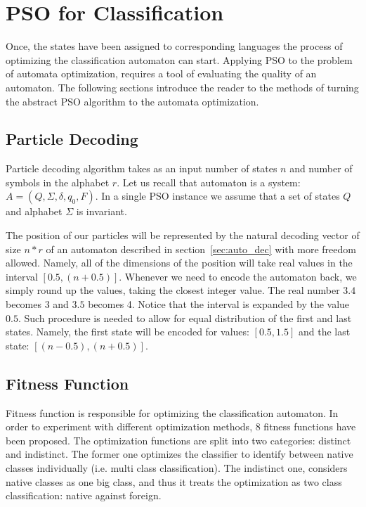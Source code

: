 \documentclass{mini}
\begin{document}
\section{PSO for Classification}

Once, the states have been assigned to corresponding languages the process of optimizing the classification automaton can start. Applying PSO to the problem of automata optimization, requires a tool of evaluating the quality of an automaton. The following sections introduce the reader to the methods of turning the abstract PSO algorithm to the  automata optimization.

\subsection{Particle Decoding}


Particle decoding algorithm takes as an input number of states $n$ and number of symbols in the alphabet $r$.
Let us recall that automaton is a system: $A = (Q, \Sigma, \delta, q_0, F)$. In a single PSO instance we assume that a set of states $Q$ and alphabet $\Sigma$ is invariant. 

The position of our particles will be represented by the natural decoding vector of size $n*r$ of an automaton described in section~\ref{sec:auto_dec} with more freedom allowed. Namely, all of the dimensions of the position will take real values in the interval $[0.5, (n+0.5)]$. Whenever we need to encode the automaton back, we simply round up the values, taking the closest integer value. The real number $3.4$ becomes $3$ and $3.5$ becomes 4. Notice that the interval is expanded by the value $0.5$. Such procedure is needed to allow for equal distribution of the first and last states. Namely, the first state will be encoded for values: $[0.5, 1.5]$ and the last state: $[(n-0.5), (n+0.5)]$.

\subsection{Fitness Function}

Fitness function is responsible for optimizing the classification automaton. In order to experiment with different optimization methods, 8 fitness functions have been proposed. The optimization functions are split into two categories: distinct and indistinct. The former one optimizes the classifier to identify between native classes individually (i.e. multi class classification). The indistinct one, considers native classes as one big class, and thus it treats the optimization as two class classification: native against foreign.
\end{document}
